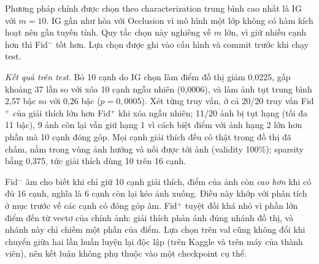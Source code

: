 Phương pháp chính được chọn theo characterization trung bình cao nhất là IG với $m = 10$. IG gần như hòa với Occlusion vì mô hình một lớp không có hàm kích hoạt nên gần tuyến tính. Quy tắc chọn này nghiêng về $m$ lớn, vì giữ nhiều cạnh hơn thì Fid$^-$ tốt hơn. Lựa chọn được ghi vào cấu hình và commit trước khi chạy test.

\textit{Kết quả trên test.} Bỏ 10 cạnh do IG chọn làm điểm đồ thị giảm 0,0225, gấp khoảng 37 lần so với xóa 10 cạnh ngẫu nhiên (0,0006), và làm ảnh tụt trung bình 2,57 bậc so với 0,26 bậc ($p = 0,0005$). Xét từng truy vấn, ở cả 20/20 truy vấn Fid$^+$ của giải thích lớn hơn Fid$^+$ khi xóa ngẫu nhiên; 11/20 ảnh bị tụt hạng (tối đa 11 bậc), 9 ảnh còn lại vẫn giữ hạng 1 vì cách biệt điểm với ảnh hạng 2 lớn hơn phần mà 10 cạnh đóng góp. Mọi cạnh giải thích đều có thật trong đồ thị đã chấm, nằm trong vùng ảnh hưởng và nối được tới ảnh (validity 100\%); sparsity bằng 0,375, tức giải thích dùng 10 trên 16 cạnh.

Fid$^-$ âm cho biết khi chỉ giữ 10 cạnh giải thích, điểm của ảnh còn \emph{cao hơn} khi có đủ 16 cạnh, nghĩa là 6 cạnh còn lại kéo ảnh xuống. Điều này khớp với phân tích ở mục trước về các cạnh có đóng góp âm. Fid$^+$ tuyệt đối khá nhỏ vì phần lớn điểm đến từ vectơ của chính ảnh: giải thích phản ánh đúng nhánh đồ thị, và nhánh này chỉ chiếm một phần của điểm. Lựa chọn trên val cũng không đổi khi chuyển giữa hai lần huấn luyện lại độc lập (trên Kaggle và trên máy của thành viên), nên kết luận không phụ thuộc vào một checkpoint cụ thể.
